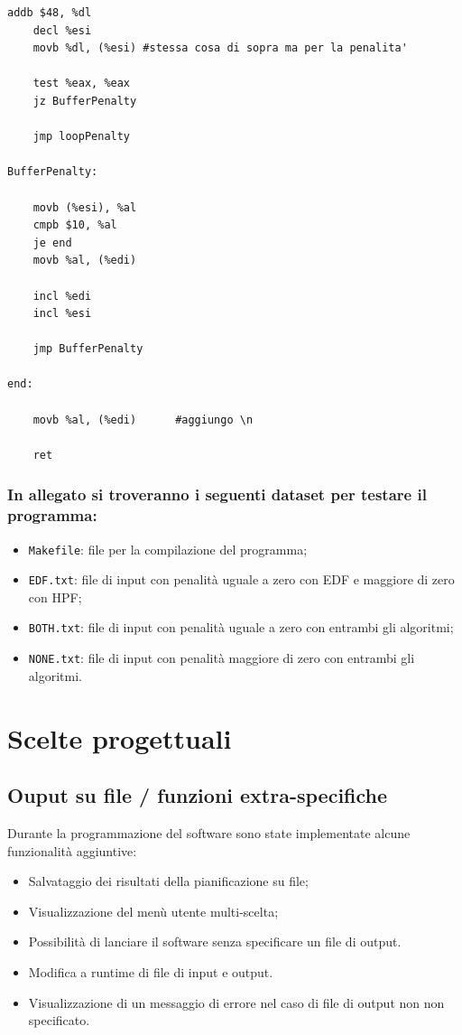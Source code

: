 \documentclass[a4paper]{report}
\begin{document}
\begin{itemize}
\begin{lstlisting}[firstnumber=130]
    addb $48, %dl
    decl %esi
    movb %dl, (%esi) #stessa cosa di sopra ma per la penalita'

    test %eax, %eax
    jz BufferPenalty

    jmp loopPenalty

BufferPenalty:

    movb (%esi), %al
    cmpb $10, %al
    je end
    movb %al, (%edi)

    incl %edi
    incl %esi

    jmp BufferPenalty

end:

    movb %al, (%edi)      #aggiungo \n
    
    ret

    \end{lstlisting}
    

  \end{itemize}

\subsubsection{In allegato si troveranno i seguenti dataset per testare il programma:}
\begin{itemize}
  \item \texttt{Makefile}: file per la compilazione del programma;
  \item \texttt{EDF.txt}: file di input con penalità uguale a zero con EDF e maggiore di zero con HPF;
  \item \texttt{BOTH.txt}: file di input con penalità uguale a zero con entrambi gli algoritmi;
  \item \texttt{NONE.txt}: file di input con penalità maggiore di zero con entrambi gli algoritmi.
\end{itemize}

\section{Scelte progettuali}

  \subsection{Ouput su file / funzioni extra-specifiche}
  Durante la programmazione del software sono state implementate alcune funzionalità aggiuntive:
    \begin{itemize}
      \item Salvataggio dei risultati della pianificazione su file;
      \item Visualizzazione del menù utente multi-scelta;
      \item Possibilità di lanciare il software senza specificare un file di output.
      \item Modifica a runtime di file di input e output.
      \item Visualizzazione di un messaggio di errore nel caso di file di output non non specificato.
    \end{itemize}
\end{document}
